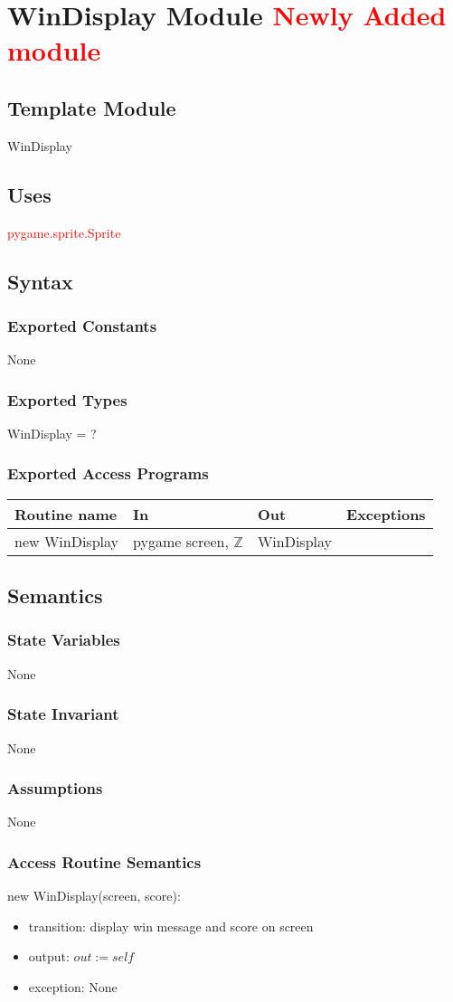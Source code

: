 \documentclass[12pt]{article}
\begin{document}
\section{WinDisplay Module \textcolor{red}{Newly Added module}}

\subsection*{Template Module}
WinDisplay

\subsection*{Uses}
\textcolor{red}{pygame.sprite.Sprite}

\subsection*{Syntax}
\subsubsection*{Exported Constants}
None
\subsubsection*{Exported Types}
WinDisplay = ?
\subsubsection*{Exported Access Programs}

\begin{tabular}{| l | l | l | p{5cm} |}
\hline
\textbf{Routine name} & \textbf{In} & \textbf{Out} & \textbf{Exceptions}\\
\hline
new WinDisplay & pygame screen, $\mathbb{Z}$ &WinDisplay& \\
\hline
\end{tabular}

\subsection*{Semantics}
\subsubsection*{State Variables}
None
\subsubsection*{State Invariant}
None
\subsubsection*{Assumptions}
None
\subsubsection*{Access Routine Semantics}
\noindent new WinDisplay(screen, score):
\begin{itemize}
\item transition: display win message and score on screen
\item output: $out := \mathit{self}$
\item exception: None
\end{itemize}
\end{document}
